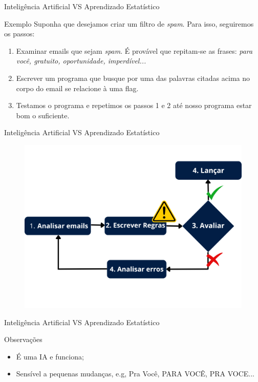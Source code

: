 \begin{frame}{Inteligência Artificial VS Aprendizado Estatístico}
	\begin{block}{Exemplo}
		\justifying
		Suponha que desejamos criar um filtro de \textit{spam}.
		Para isso, seguiremos os passos:
		\begin{enumerate}
			\justifying
			\item Examinar emails que sejam \textit{spam}.
			É provável que repitam-se as frases: \textit{para você, gratuito, oportunidade, imperdível...}
			\item Escrever um programa que busque por uma das palavras citadas acima no corpo do email se relacione à uma flag.
			\item Testamos o programa e repetimos os passos 1 e 2 até nosso programa estar bom o suficiente. 
		\end{enumerate}
	\end{block}
\end{frame}
\begin{frame}{Inteligência Artificial VS Aprendizado Estatístico}
	\begin{figure}[h]
		\includegraphics[scale=0.4]{imagens//secao1/tradicionalspam.png}
	\end{figure}
\end{frame}


\begin{frame}{Inteligência Artificial VS Aprendizado Estatístico}
	\begin{block}{Observações}
		\begin{itemize}
			\item É uma IA e funciona;
			\item Sensível a pequenas mudanças, e.g, Pra Você, PARA VOCÊ, PRA VOCE...
		\end{itemize}
	\end{block}
\end{frame}

